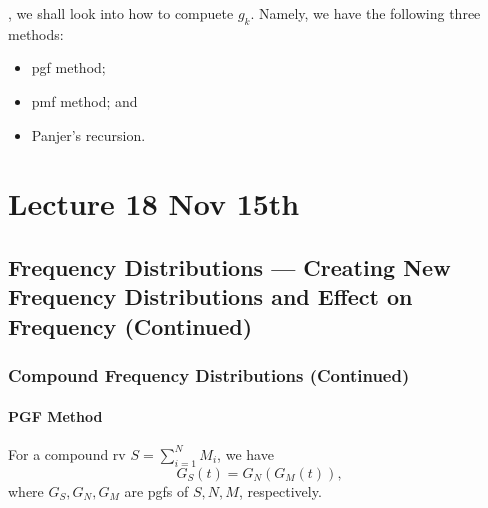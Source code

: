 \documentclass[notoc,notitlepage]{tufte-book}
\begin{document}
, we shall look into how to compuete $g_k$. Namely, we have the following three methods:
\begin{itemize}
  \item pgf method;
  \item pmf method; and
  \item Panjer's recursion.
\end{itemize}




\chapter{Lecture 18 Nov 15th}%
\label{chp:lecture_18_nov_15th}

\section{Frequency Distributions --- Creating New Frequency Distributions and Effect on Frequency (Continued)}%
\label{sec:frequency_distributions_creating_new_frequency_distributions_and_effect_on_frequency_continued}

\subsection{Compound Frequency Distributions (Continued)}%
\label{sub:compound_frequency_distributions_continued}

\subsubsection{PGF Method}%
\label{ssub:pgf_method}

\begin{propo}\label{propo:pgf_method_for_compound_rvs}
  For a compound rv $S = \sum_{i=1}^{N} M_i$, we have
  \begin{equation*}
    G_S(t) = G_N( G_M(t) ),
  \end{equation*}
  where $G_S, G_N, G_M$ are pgfs of $S, N, M$, respectively.
\end{propo}
\end{document}
